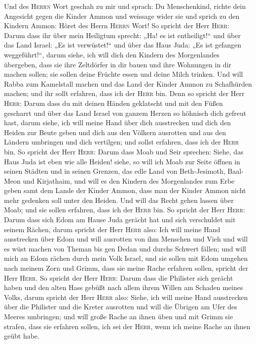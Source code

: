  Und des \textsc{Herrn} Wort geschah zu mir und sprach:
 Du Menschenkind, richte dein Angesicht gegen die Kinder
Ammon und weissage wider sie  und sprich zu den Kindern
Ammon: Höret des Herrn \textsc{Herrn} Wort! So spricht der Herr
\textsc{Herr}: Darum dass ihr über mein Heiligtum sprecht: „Ha! es ist
entheiligt!{}`` und über das Land Israel: „Es ist verwüstet!{}`` und
über das Haus Juda: „Es ist gefangen weggeführt!{}``, 
darum siehe, ich will dich den Kindern des Morgenlandes übergeben, dass
sie ihre Zeltdörfer in dir bauen und ihre Wohnungen in dir machen
sollen; sie sollen deine Früchte essen und deine Milch trinken.
 Und will Rabba zum Kamelstall machen und das Land der
Kinder Ammon zu Schafhürden machen; und ihr sollt erfahren, dass ich der
\textsc{Herr} bin.  Denn so spricht der Herr
\textsc{Herr}: Darum dass du mit deinen Händen geklatscht und mit den
Füßen gescharrt und über das Land Israel von ganzem Herzen so höhnisch
dich gefreut hast,  darum siehe, ich will meine Hand über
dich ausstrecken und dich den Heiden zur Beute geben und dich aus den
Völkern ausrotten und aus den Ländern umbringen und dich vertilgen; und
sollst erfahren, dass ich der \textsc{Herr} bin.  So
spricht der Herr \textsc{Herr}: Darum dass Moab und Seir sprechen:
Siehe, das Haus Juda ist eben wie alle Heiden!  siehe, so
will ich Moab zur Seite öffnen in seinen Städten und in seinen Grenzen,
das edle Land von Beth-Jesimoth, Baal-Meon und Kirjathaim,
 und will es den Kindern des Morgenlandes zum Erbe geben
samt dem Lande der Kinder Ammon, dass man der Kinder Ammon nicht mehr
gedenken soll unter den Heiden.  Und will das Recht gehen
lassen über Moab; und sie sollen erfahren, dass ich der \textsc{Herr}
bin.  So spricht der Herr \textsc{Herr}: Darum dass sich
Edom am Hause Juda gerächt hat und sich verschuldet mit seinem Rächen,
 darum spricht der Herr \textsc{Herr} also: Ich will
meine Hand ausstrecken über Edom und will ausrotten von ihm Menschen und
Vieh und will es wüst machen von Theman bis gen Dedan und durchs Schwert
fällen;  und will mich an Edom rächen durch mein Volk
Israel, und sie sollen mit Edom umgehen nach meinem Zorn und Grimm, dass
sie meine Rache erfahren sollen, spricht der Herr \textsc{Herr}.
 So spricht der Herr \textsc{Herr}: Darum dass die
Philister sich gerächt haben und den alten Hass gebüßt nach allem ihrem
Willen am Schaden meines Volks,  darum spricht der Herr
\textsc{Herr} also: Siehe, ich will meine Hand ausstrecken über die
Philister und die Kreter ausrotten und will die Übrigen am Ufer des
Meeres umbringen;  und will große Rache an ihnen üben und
mit Grimm sie strafen, dass sie erfahren sollen, ich sei der
\textsc{Herr}, wenn ich meine Rache an ihnen geübt habe.

